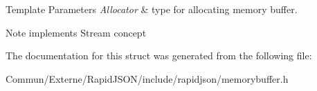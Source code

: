 \begin{DoxyTemplParams}{Template Parameters}
{\em Allocator} & type for allocating memory buffer. \\
\hline
\end{DoxyTemplParams}
\begin{DoxyNote}{Note}
implements Stream concept 
\end{DoxyNote}


The documentation for this struct was generated from the following file\+:\begin{DoxyCompactItemize}
\item 
Commun/\+Externe/\+Rapid\+J\+S\+O\+N/include/rapidjson/memorybuffer.\+h\end{DoxyCompactItemize}
